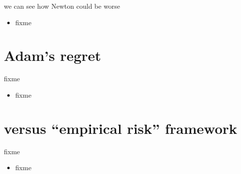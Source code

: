 \documentclass[xcolor={svgnames},
               hyperref={colorlinks,citecolor=DeepPink4,linkcolor=FireBrick,urlcolor=Maroon}]
               {beamer}
\begin{document}
\begin{frame}{we can see how Newton could be worse}

\begin{itemize}
\item fixme
\end{itemize}
\end{frame}


\section{Adam's regret}

\begin{frame}{fixme}

\begin{itemize}
\item fixme
\end{itemize}
\end{frame}


\section{versus ``empirical risk'' framework}

\begin{frame}{fixme}

\begin{itemize}
\item fixme
\end{itemize}
\end{frame}
\end{document}
